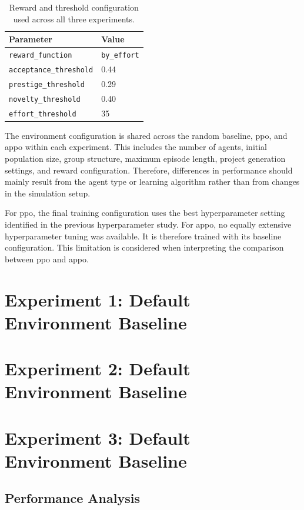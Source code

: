 \documentclass[english,bachelor]{hsluthesis}
\begin{document}
\begin{table}[H]
\centering
\begin{tabular}{l l}
\hline
Parameter & Value \\
\hline
\texttt{reward\_function} & \texttt{by\_effort} \\
\texttt{acceptance\_threshold} & 0.44 \\
\texttt{prestige\_threshold} & 0.29 \\
\texttt{novelty\_threshold} & 0.40 \\
\texttt{effort\_threshold} & 35 \\
\hline
\end{tabular}
\caption{Reward and threshold configuration used across all three experiments.}
\label{tab:reward_configs}
\end{table}

The environment configuration is shared across the random baseline, \gls{ppo}, and \gls{appo} within each experiment. This includes the number of agents, initial population size, group structure, maximum episode length, project generation settings, and reward configuration. Therefore, differences in performance should mainly result from the agent type or learning algorithm rather than from changes in the simulation setup.

For \gls{ppo}, the final training configuration uses the best hyperparameter setting identified in the previous hyperparameter study. For \gls{appo}, no equally extensive hyperparameter tuning was available. It is therefore trained with its baseline configuration. This limitation is considered when interpreting the comparison between \gls{ppo} and \gls{appo}.


\section{Experiment 1: Default Environment Baseline}

\section{Experiment 2: Default Environment Baseline}

\section{Experiment 3: Default Environment Baseline}

\subsection{Performance Analysis}
\end{document}
